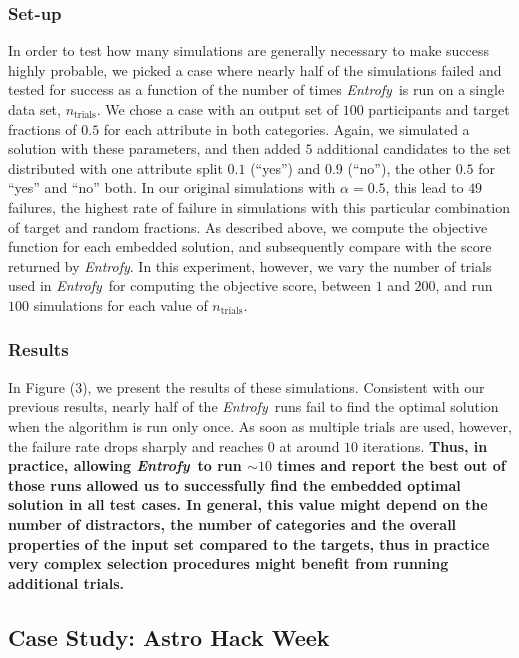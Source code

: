 \documentclass[12pt]{article}
\newcommand{\project}[1]{\textsl{#1}}
\newcommand{\entrofy}{\project{Entrofy}}
\begin{document}
\subsubsection*{Set-up}
In order to test how many simulations are generally necessary to make success highly probable, we picked a case where nearly half of the simulations failed and tested for success as a function of the 
number of times \entrofy\ is run on a single data set, $n_\mathrm{trials}$. We chose a case with an output set of $100$ participants and target fractions of $0.5$ for each attribute in both categories. Again, we simulated a solution with these parameters, and then added $5$ additional candidates to the set distributed with one attribute split $0.1$ (``yes'') and $0.9$ (``no''), the other $0.5$ for ``yes'' and ``no'' both. In our original simulations with $\alpha = 0.5$, this lead to $49$ failures, the highest rate of failure in simulations with this particular combination of target and random fractions. As described above, we compute the objective function for each embedded solution, and subsequently compare with the score returned by \entrofy. In this experiment, however, we vary the number of trials used in \entrofy\ for computing the objective score, between $1$ and $200$, and run $100$ simulations for each value of $n_\mathrm{trials}$. 

\subsubsection*{Results}

In Figure (3), we present the results of these simulations. Consistent with our previous results, nearly half of the \entrofy\ runs fail to find the optimal solution when the algorithm is run only once. As soon as multiple trials are used, however, the failure rate drops sharply and reaches $0$ at around $10$ iterations. \textbf{Thus, in practice, allowing \entrofy\ to run $\sim 10$ times and report the best out of those runs allowed us to successfully find the embedded optimal solution in all test cases. In general, this value might depend on the number of distractors, the number of categories and the overall properties of the input set compared to the targets, thus in practice very complex selection procedures might benefit from running additional trials.}

\subsection*{Case Study: Astro Hack Week}
\label{sec:casestudy}
\end{document}
